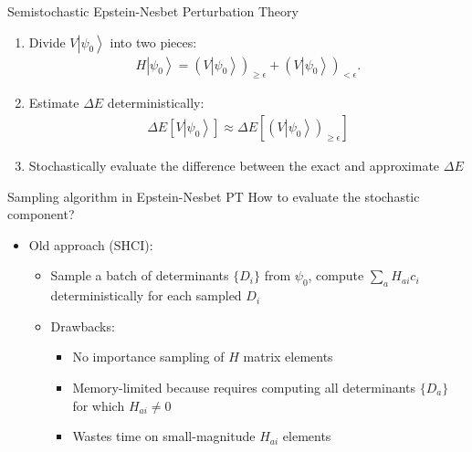 \documentclass[amsmath]{beamer}
\begin{document}
\begin{frame}{Semistochastic Epstein-Nesbet Perturbation Theory}
	\begin{enumerate}
		\item Divide $V\left|\psi_0\right\rangle$ into two pieces:
		\begin{eqnarray}
			H\left|\psi_0\right\rangle = \left(V\left|\psi_0\right\rangle\right)_{\ge \epsilon} + \left(V\left|\psi_0\right\rangle\right)_{<\epsilon}.
		\end{eqnarray}
		\item Estimate $\Delta E$ deterministically:
		\begin{eqnarray}
			\Delta E\left[V\left|\psi_0\right\rangle\right] \approx \Delta E\left[\left(V\left|\psi_0\right\rangle\right)_{\ge \epsilon}\right] 
		\end{eqnarray}
		\item Stochastically evaluate the difference between the exact and approximate $\Delta E$
	\end{enumerate}
\end{frame}

\begin{frame}{Sampling algorithm in Epstein-Nesbet PT}
	How to evaluate the stochastic component?
	\linebreak
	\begin{itemize}
		\item Old approach (SHCI):
		\linebreak
		\begin{itemize}
			\item Sample a batch of determinants $\{D_i\}$ from $\psi_0$, compute $\sum_a H_{ai}c_i$ deterministically for each sampled $D_i$
			\linebreak
			\item Drawbacks:
			\begin{itemize}
				\item No importance sampling of $H$ matrix elements
				\item Memory-limited because requires computing all determinants $\{D_a\}$ for which $H_{ai}\ne 0$
				\item Wastes time on small-magnitude $H_{ai}$ elements
			\end{itemize}
		\end{itemize}
	\end{itemize}
\end{frame}
\end{document}
